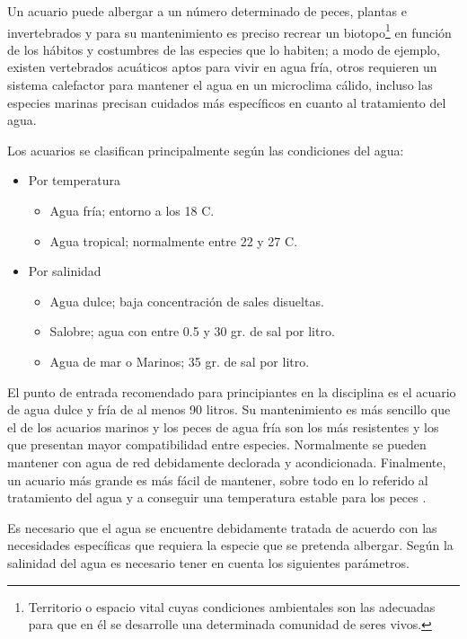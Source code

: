 Un acuario puede albergar a un número determinado de peces, plantas e invertebrados y para su mantenimiento es preciso recrear un biotopo\footnote{Territorio o espacio vital cuyas condiciones ambientales son las adecuadas para que en él se desarrolle una determinada comunidad de seres vivos.} en función de los hábitos y costumbres de las especies que lo habiten; a modo de ejemplo, existen vertebrados acuáticos aptos para vivir en agua fría, otros requieren un sistema calefactor para mantener el agua en un microclima cálido, incluso las especies marinas precisan cuidados más específicos en cuanto al tratamiento del agua.

Los acuarios se clasifican principalmente según las condiciones del agua:
\begin{itemize}
	\item Por temperatura
	\begin{itemize}
		\item Agua fría; entorno a los 18 \degree C.
		\item Agua tropical; normalmente entre 22 y 27 \degree C.
	\end{itemize}
	\vspace{5px}
	\item Por salinidad
	\begin{itemize}
		\item Agua dulce; baja concentración de sales disueltas.
		\item Salobre; agua con entre 0.5 y 30 gr. de sal por litro.
		\item Agua de mar o Marinos; 35 gr. de sal por litro. 
	\end{itemize}
\end{itemize}

El punto de entrada recomendado para principiantes en la disciplina es el acuario de agua dulce y fría de al menos 90 litros.  Su mantenimiento es más sencillo que el de los acuarios marinos y los peces de agua fría son los más resistentes y los que presentan mayor compatibilidad entre especies. Normalmente se pueden mantener con agua de red debidamente declorada y acondicionada. Finalmente, un acuario más grande es más fácil de mantener, sobre todo en lo referido al tratamiento del agua y a conseguir una temperatura estable para los peces \citep{paradais1}.

Es necesario que el agua se encuentre debidamente tratada de acuerdo con las necesidades específicas que requiera la especie que se pretenda albergar. Según la salinidad del agua es necesario tener en cuenta los siguientes parámetros.

